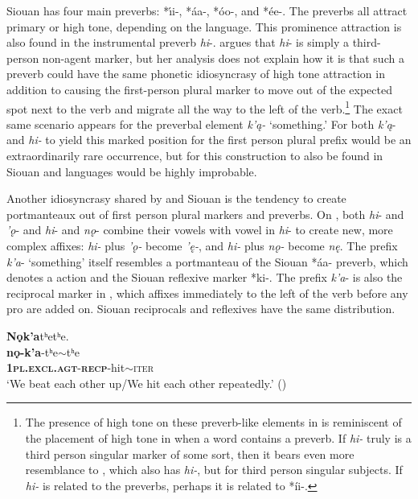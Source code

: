 \documentclass[output=paper]{LSP/langsci}
\begin{document}
Siouan has four main preverbs: *\'\i i-, *\'aa-, *\'oo-, and *\'ee-. The preverbs all attract primary  or high tone, depending on the language. This prominence attraction is also found in the  instrumental preverb \emph{hi}-. \citet{Linn2000} argues that \emph{hi}- is simply a third-person non-agent marker, but her analysis does not explain how it is that such a preverb could have the same phonetic idiosyncrasy of high tone attraction in addition to causing the first-person plural marker to move out of the expected spot next to the verb and migrate all the way to the left of the verb.\footnote{The presence of high tone on these preverb-like elements in  is reminiscent of the placement of high tone in  when a word contains a preverb. If \emph{hi-} truly is a third person singular marker of some sort, then it bears even more resemblance to , which also has \emph{hi-}, but for third person singular subjects. If \emph{hi-} is related to the  preverbs, perhaps it is related to *\'ii-.} 
The exact same scenario appears for the preverbal element \emph{k'\k{a}-} `something.' For both \emph{k'\k{a}}- and \emph{hi-} to yield this marked position for the first person plural prefix would be an extraordinarily rare occurrence, but for this construction to also be found in Siouan and  languages would be highly improbable.

Another idiosyncrasy shared by  and Siouan is the tendency to create portmanteaux out of first person plural markers and preverbs. On , both \emph{hi}- and \emph{'\k{o}}- and \emph{hi}- and \emph{n\k{o}}- combine their vowels with vowel in \emph{hi}- to create new, more complex affixes: \emph{hi-} plus \emph{'\k{o}-} become \emph{'\k{e}-}, and \emph{hi-} plus \emph{n\k{o}-} become \emph{n\k{e}}. The prefix \emph{k'a}- `something' itself resembles a portmanteau of the Siouan *\'aa- preverb, which denotes a  action and the Siouan reflexive marker *ki-. The prefix \emph{k'a}- is also the reciprocal marker in , which affixes immediately to the left of the verb before any pro are added on. Siouan reciprocals and reflexives have the same distribution.

\ea \label{yuchimandan}
	\ea
	\glll  \textbf{N\k{o}k'a}tʰetʰe.\\ 
	\textbf{n\k{o}-k'a}-tʰe$\sim$tʰe\\
			\textbf{\textsc{1pl.excl.agt}}-\textbf{\textsc{recp}}-hit$\sim$\textsc{iter}\\ 
	\glt `We beat each other up/We hit each other repeatedly.' (\citealt[250]{Linn2000})
	
\end{document}
